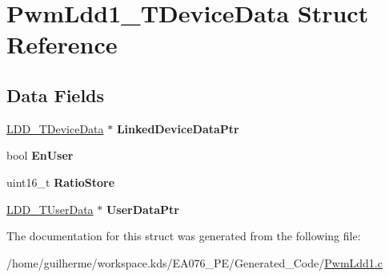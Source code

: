 \hypertarget{struct_pwm_ldd1___t_device_data}{}\section{Pwm\+Ldd1\+\_\+\+T\+Device\+Data Struct Reference}
\label{struct_pwm_ldd1___t_device_data}
\subsection*{Data Fields}
\begin{DoxyCompactItemize}
\item 
\mbox{\label{struct_pwm_ldd1___t_device_data_a0846adada75d4372e1ab909d6f34961e}} 
\hyperlink{group___p_e___types__module_gac5cf1362f1f0e3a2ce71b1bf2276d091}{L\+D\+D\+\_\+\+T\+Device\+Data} $\ast$ {\bfseries Linked\+Device\+Data\+Ptr}
\item 
\mbox{\label{struct_pwm_ldd1___t_device_data_aae6e611988890b6a678fe9bac48cabb7}} 
bool {\bfseries En\+User}
\item 
\mbox{\label{struct_pwm_ldd1___t_device_data_a9fb70a36a36b2051eeaa496c03238f14}} 
uint16\+\_\+t {\bfseries Ratio\+Store}
\item 
\mbox{\label{struct_pwm_ldd1___t_device_data_afb2c79616b2c16a40a1371b8812c67e5}} 
\hyperlink{group___p_e___types__module_ga0b66a73f87238a782318aa0be7578e35}{L\+D\+D\+\_\+\+T\+User\+Data} $\ast$ {\bfseries User\+Data\+Ptr}
\end{DoxyCompactItemize}


The documentation for this struct was generated from the following file\+:\begin{DoxyCompactItemize}
\item 
/home/guilherme/workspace.\+kds/\+E\+A076\+\_\+\+P\+E/\+Generated\+\_\+\+Code/\hyperlink{_pwm_ldd1_8c}{Pwm\+Ldd1.\+c}\end{DoxyCompactItemize}
